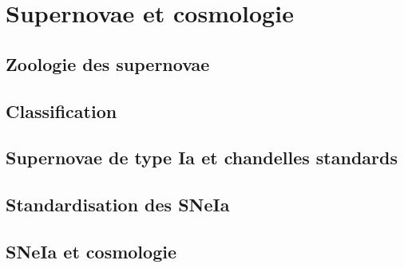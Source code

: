 \documentclass[../main/main.tex]{subfiles}
\begin{document}
\section{Supernovae et cosmologie}\label{sec:snia}

\subsection{Zoologie des supernovae}
\subsection{Classification}
\subsection{Supernovae de type Ia et chandelles standards}
\subsection{Standardisation des SNeIa}
\subsection{SNeIa et cosmologie}\label{ssec:class}



%
%
\end{document}
